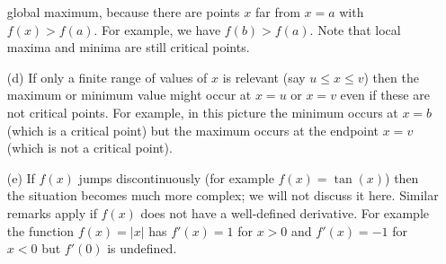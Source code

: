 \documentclass[reqno]{amsart}
\theoremstyle{definition}
\begin{document}
\begin{itemize}
  global maximum, because there are points $x$ far from $x=a$ with
  $f(x)>f(a)$.  For example, we have $f(b)>f(a)$.  Note that local
  maxima and minima are still critical points.
 \item[(d)] If only a finite range of values of $x$ is relevant (say
  $u\leq x\leq v$) then the maximum or minimum value might occur at
  $x=u$ or $x=v$ even if these are not critical points.  For example,
  in this picture the minimum occurs at $x=b$ (which is a critical
  point) but the maximum occurs at the endpoint $x=v$ (which is not a
  critical point).  
  \begin{center}
  \end{center}
 \item[(e)] If $f(x)$ jumps discontinuously (for example
  $f(x)=\tan(x)$) then the situation becomes much more complex; we
  will not discuss it here.  Similar remarks apply if $f(x)$ does not
  have a well-defined derivative.  For example the function $f(x)=|x|$
  has $f'(x)=1$ for $x>0$ and $f'(x)=-1$ for $x<0$ but $f'(0)$ is
  undefined.  
\end{itemize}
\end{document}
